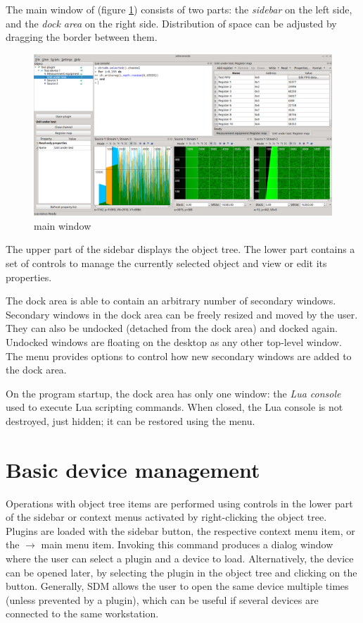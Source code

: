 \documentclass[a4paper,12pt,twoside,extrafontsizes]{memoir}
\begin{document}
The main window of  (figure \ref{fig:sdmconsolemain}) consists of two parts: the \emph{sidebar} on the left side, and the \emph{dock area} on the right side. Distribution of space can be adjusted by dragging the border between them.

\begin{figure}[htbp]
\centering
\includegraphics[scale=0.35]{images/sdmconsolemain.png}
\caption{ main window}
\label{fig:sdmconsolemain}
\end{figure}

The upper part of the sidebar displays the object tree. The lower part contains a set of controls to manage the currently selected object and view or edit its properties.

The dock area is able to contain an arbitrary number of secondary windows. Secondary windows in the dock area can be freely resized and moved by the user. They can also be undocked (detached from the dock area) and docked again. Undocked windows are floating on the desktop as any other top-level window. The  menu provides options to control how new secondary windows are added to the dock area.

On the program startup, the dock area has only one window: the \emph{Lua console} used to execute Lua scripting commands. When closed, the Lua console is not destroyed, just hidden; it can be restored using the  menu.

\section{Basic device management}

Operations with object tree items are performed using controls in the lower part of the sidebar or context menus activated by right-clicking the object tree. Plugins are loaded with the  sidebar button, the respective context menu item, or the  $\rightarrow$  main menu item. Invoking this command produces a dialog window where the user can select a plugin and a device to load. Alternatively, the device can be opened later, by selecting the plugin in the object tree and clicking on the  button. Generally, SDM allows the user to open the same device multiple times (unless prevented by a plugin), which can be useful if several devices are connected to the same workstation.
\end{document}
